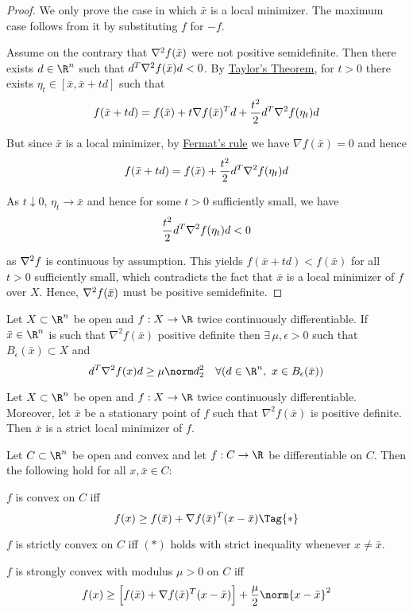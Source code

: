 \begin{proof}
  \def\x{\bar x}
  \def\H#1{\nabla^2f\ifx&#1&\else(#1)\fi}
  \def\G{\nabla f(\x)}
  We only prove the case in which $\x$ is a local minimizer. The maximum case
  follows from it by substituting $f$ for $-f$.

  Assume on the contrary that $\H\x$ were not positive semidefinite. Then there
  exists $d\in\R^n$ such that $d^T\H\x d<0$. By \href{b90111f}{Taylor's Theorem},
  for $t>0$ there exists $\eta_t\in[\x,\x+td]$ such that
  $$
    f(\x+td)=f(\x)+t\G^Td+\frac{t^2}2d^T\H{\eta_t}d
  $$

  But since $\x$ is a local minimizer, by \href{dc165c9}{Fermat's rule} we have
  $\G=0$ and hence
  $$
    f(\x+td)=f(\x)+\frac{t^2}2d^T\H{\eta_t}d
  $$

  As $t\downarrow0$, $\eta_t\to\x$ and hence for some $t>0$ sufficiently small,
  we have
  $$
    \frac{t^2}2d^T\H{\eta_t}d<0
  $$

  as $\H{}$ is continuous by assumption. This yields $f(\x+td)<f(\x)$ for all
  $t>0$ sufficiently small, which contradicts the fact that $\x$ is a local
  minimizer of $f$ over $X$. Hence, $\H\x$ must be positive semidefinite.
\end{proof}

\label{eaa0d24}

Let $X\subset\R^n$ be open and $f:X\to\R$ twice continuously differentiable. If
$\bar x\in\R^n$ is such that $\nabla^2f(\bar x)$ positive definite then
$\exists\,\mu,\epsilon>0$ such that $B_\epsilon(\bar x)\subset X$ and
$$
  d^T\nabla^2f(x)d\geq\mu\norm d^2_2\quad\forall(d\in\R^n,\
  x\in B_\epsilon(\bar x))
$$

\label{b43d95d}

Let $X\subset\R^n$ be open and $f:X\to\R$ twice continuously differentiable.
Moreover, let $\bar x$ be a stationary point of $f$ such that $\nabla^2f(\bar
x)$ is positive definite. Then $\bar x$ is a strict local minimizer of $f$.

\label{cd9cea7}

Let $C\subset\R^n$ be open and convex and let $f:C\to\R$ be differentiable on
$C$. Then the following hold for all $x,\bar x\in C$:
\begin{enumerata}
  \item $f$ is convex on $C$ iff
  \begin{equation*}
    f(x)\geq f(\bar x)+\nabla f(\bar x)^T(x-\bar x)\Tag{*}
  \end{equation*}
  \item $f$ is strictly convex on $C$ iff $(*)$ holds with strict
  inequality whenever $x\neq\bar x$.
  \item $f$ is strongly convex with modulus $\mu>0$ on $C$ iff
  $$
    f(x)\geq\Big[f(\bar x)+\nabla f(\bar x)^T(x-\bar x)\Big]
    +\frac\mu2\norm{x-\bar x}^2
  $$
\end{enumerata}

